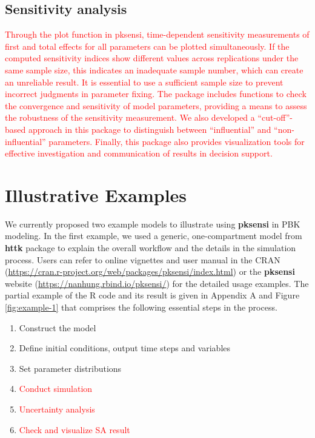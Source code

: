 \documentclass[preprint,12pt, a4paper]{elsarticle}
\begin{document}
\subsection{Sensitivity analysis}

\textcolor{red}{Through the plot function in pksensi, time-dependent sensitivity measurements of first and total effects for all parameters can be plotted simultaneously. If the computed sensitivity indices show different values across replications under the same sample size, this indicates an inadequate sample number, which can create an unreliable result. It is essential to use a sufficient sample size to prevent incorrect judgments in parameter fixing. The package includes functions to check the convergence and sensitivity of model parameters, providing a means to assess the robustness of the sensitivity measurement. We also developed a ``cut-off''-based approach in this package to distinguish between ``influential'' and ``non-influential'' parameters. Finally, this package also provides visualization tools for effective investigation and communication of results in decision support.}


\section{Illustrative Examples}

We currently proposed two example models to illustrate using \textbf{pksensi} in PBK modeling. In the first example, we used a generic, one-compartment model from \textbf{httk} package \cite{JSSv079i04} to explain the overall workflow and the details in the simulation process. Users can refer to online vignettes and user manual in the CRAN (\url{https://cran.r-project.org/web/packages/pksensi/index.html}) or the \textbf{pksensi} website (\url{https://nanhung.rbind.io/pksensi/}) for the detailed usage examples. The partial example of the R code and its result is given in Appendix A and Figure \ref{fig:example-1} that comprises the following essential steps in the process.

\begin{enumerate}
  \item Construct the model
  \item Define initial conditions, output time steps and variables
  \item Set parameter distributions
  \item \textcolor{red}{Conduct simulation}
  \item \textcolor{red}{Uncertainty analysis}
  \item \textcolor{red}{Check and visualize SA result}
\end{enumerate}
\end{document}
